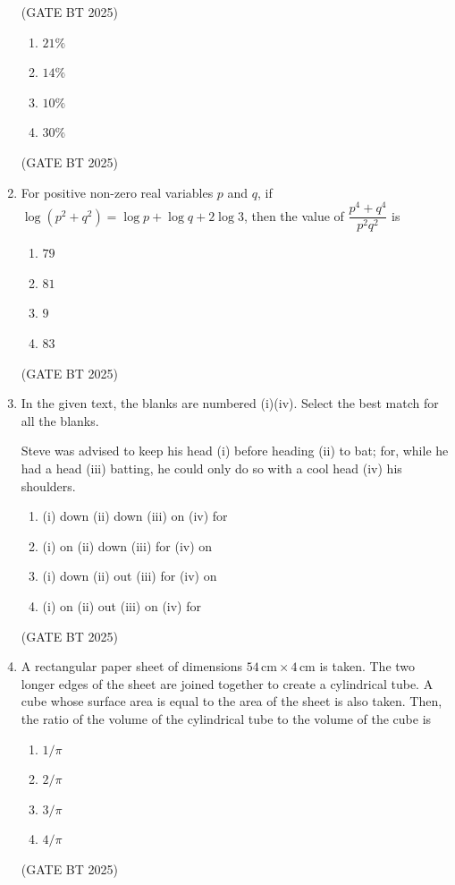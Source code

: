 \documentclass[journal,12pt,onecolumn]{IEEEtran}
\theoremstyle{remark}
\begin{document}
\begin{enumerate}
\hfill (GATE BT 2025)


\begin{enumerate}
    \item $21\%$
    \item $14\%$
    \item $10\%$
    \item $30\%$
\end{enumerate}
\hfill(GATE BT 2025)

\item 
For positive non-zero real variables $p$ and $q$, if $\log(p^2+q^2)=\log p+\log q+2\log 3$, then the value of $\dfrac{p^4+q^4}{p^2 q^2}$ is

\begin{enumerate}
    \item $79$
    \item $81$
    \item $9$
    \item $83$
\end{enumerate}
\hfill(GATE BT 2025)

\item 
In the given text, the blanks are numbered (i)(iv). Select the best match for all the blanks. 

Steve was advised to keep his head (i) before heading (ii) to bat; for, while he had a head (iii) batting, he could only do so with a cool head (iv) his shoulders. 

\begin{enumerate}
    \item (i) down (ii) down (iii) on (iv) for
    \item (i) on (ii) down (iii) for  (iv) on
    \item (i) down (ii) out (iii) for (iv) on
    \item (i) on (ii) out  (iii) on (iv) for
\end{enumerate}
\hfill(GATE BT 2025)

\item 
A rectangular paper sheet of dimensions $54\,\text{cm} \times 4\,\text{cm}$ is taken. The two longer edges of the sheet are joined together to create a cylindrical tube. A cube whose surface area is equal to the area of the sheet is also taken. Then, the ratio of the volume of the cylindrical tube to the volume of the cube is

\begin{enumerate}
    \item $1/\pi$
    \item $2/\pi$
    \item $3/\pi$
    \item $4/\pi$
\end{enumerate}
\hfill(GATE BT 2025)


\end{enumerate}
\end{document}
